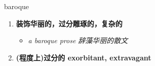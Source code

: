 
\begin{frame}
{\huge baroque}
\begin{center}
\begin{enumerate}\Large
  \item \textbf{装饰华丽的，过分雕琢的，复杂的}
  \begin{itemize}
    \item \em{\Large{a baroque prose 辞藻华丽的散文}}
  \end{itemize}
  \item \textbf{(程度上)过分的 exorbitant, extravagant}
\end{enumerate}
\end{center}
\end{frame}

